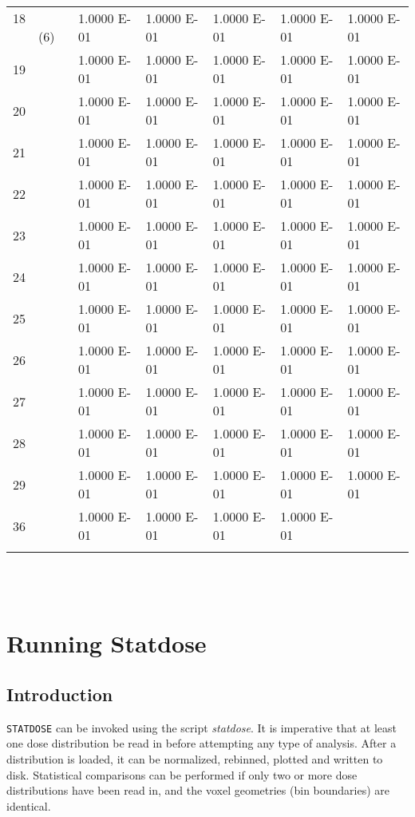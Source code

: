 \documentclass[12pt,twoside]{article}
\begin{document}
{\begin{tabular}[t]{||p{1.5cm}|p{2cm}|p{2cm}|p{2cm}|p{2cm}|p{2cm}||}
18 ~~~~(6)    & 1.0000 E-01    & 1.0000 E-01    & 1.0000 E-01    & 1.0000 E-01 & 1.0000 E-01   \\
19 & 1.0000 E-01    & 1.0000 E-01    & 1.0000 E-01 & 1.0000 E-01    & 1.0000 E-01  \\
20  & 1.0000 E-01    & 1.0000 E-01 &  1.0000 E-01    & 1.0000 E-01    & 1.0000 E-01   \\
21 & 1.0000 E-01 & 1.0000 E-01    & 1.0000 E-01    & 1.0000 E-01    & 1.0000 E-01 \\
22    & 1.0000 E-01    & 1.0000 E-01    & 1.0000 E-01    & 1.0000 E-01 & 1.0000 E-01   \\
23 & 1.0000 E-01    & 1.0000 E-01    & 1.0000 E-01 &  1.0000 E-01    & 1.0000 E-01   \\
24 & 1.0000 E-01    & 1.0000 E-01 & 1.0000 E-01    & 1.0000 E-01    & 1.0000 E-01   \\
25 & 1.0000 E-01  &  1.0000 E-01    & 1.0000 E-01    & 1.0000 E-01    & 1.0000 E-01 \\
26    & 1.0000 E-01    & 1.0000 E-01    & 1.0000 E-01    & 1.0000 E-01 &  1.0000 E-01   \\
27 & 1.0000 E-01    & 1.0000 E-01    & 1.0000 E-01 &  1.0000 E-01    & 1.0000 E-01   \\
28 & 1.0000 E-01    & 1.0000 E-01 & 1.0000 E-01    & 1.0000 E-01    & 1.0000 E-01    \\
29 & 1.0000 E-01 &  1.0000 E-01    & 1.0000 E-01    & 1.0000 E-01    & 1.0000 E-01  \\
36    & 1.0000 E-01    & 1.0000 E-01    & 1.0000 E-01    & 1.0000 E-01 & \\
& & & & & \\
\hline\hline
\end{tabular}
}
\newline\\
\newline\\

\section{Running Statdose}

\subsection{Introduction}

\verb+STATDOSE+ can be invoked using the script {\em statdose}. It is
imperative that at least one dose distribution be read in before
attempting any type of analysis. After a distribution is loaded, it can be
normalized, rebinned, plotted and written to disk.  Statistical
comparisons can be performed if only two or more dose distributions have
been read in, and the voxel geometries (bin boundaries) are identical.\\
\end{document}

